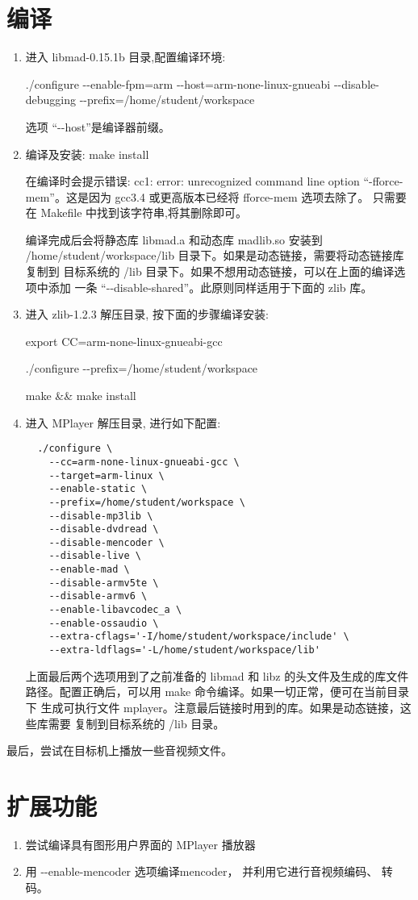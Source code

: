\section{编译}
\begin{enumerate}
  \item 进入 libmad-0.15.1b 目录,配置编译环境:

	./configure -{}-enable-fpm=arm -{}-host=arm-none-linux-gnueabi
	-{}-disable-debugging -{}-prefix=/home/student/workspace

	选项 ``-{}-host''是编译器前缀。

  \item 编译及安装:  make install

	在编译时会提示错误: cc1: error: unrecognized command line option
	``-fforce-mem''。这是因为 gcc3.4 或更高版本已经将 fforce-mem 选项去除了。
	只需要在 Makefile 中找到该字符串,将其删除即可。

	编译完成后会将静态库 libmad.a 和动态库 madlib.so 安装到
	/home/student/workspace/lib 目录下。如果是动态链接，需要将动态链接库复制到
	目标系统的 /lib 目录下。如果不想用动态链接，可以在上面的编译选项中添加
	一条 ``-{}-disable-shared''。此原则同样适用于下面的 zlib 库。

  \item 进入 zlib-1.2.3 解压目录, 按下面的步骤编译安装:

	export CC=arm-none-linux-gnueabi-gcc

	./configure -{}-prefix=/home/student/workspace

        make \&\& make install

  \item 进入 MPlayer 解压目录, 进行如下配置:
\begin{verbatim}
  ./configure \
    --cc=arm-none-linux-gnueabi-gcc \
    --target=arm-linux \
    --enable-static \
    --prefix=/home/student/workspace \
    --disable-mp3lib \
    --disable-dvdread \
    --disable-mencoder \
    --disable-live \
    --enable-mad \
    --disable-armv5te \
    --disable-armv6 \
    --enable-libavcodec_a \
    --enable-ossaudio \
    --extra-cflags='-I/home/student/workspace/include' \
    --extra-ldflags='-L/home/student/workspace/lib'
    \end{verbatim}
	上面最后两个选项用到了之前准备的 libmad 和 libz 的头文件及生成的库文件
	路径。配置正确后，可以用 make 命令编译。如果一切正常，便可在当前目录下
	生成可执行文件 mplayer。注意最后链接时用到的库。如果是动态链接，这些库需要
	复制到目标系统的 /lib 目录。
\end{enumerate}

	最后，尝试在目标机上播放一些音视频文件。

\section{扩展功能}
\begin{enumerate}
  \item 尝试编译具有图形用户界面的 MPlayer 播放器
  \item 用 -{}-enable-mencoder 选项编译mencoder， 并利用它进行音视频编码、
	转码。
\end{enumerate}
